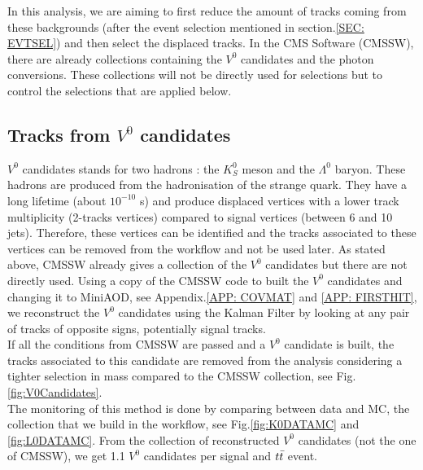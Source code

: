 \documentclass{cernatlasnote}
\begin{document}
    In this analysis, we are aiming to first reduce the amount of tracks coming from these backgrounds (after the event selection mentioned in section.\ref{SEC: EVTSEL}) and then select the displaced tracks. In the CMS Software (CMSSW), there are already collections containing the $V^0$ candidates and the photon conversions. These collections will not be directly used for selections but to control the selections that are applied below.

    
    \subsection{Tracks from $V^0$ candidates}
        $V^0$ candidates stands for two hadrons : the $K^0_S$ meson and the $\Lambda^{0}$ baryon. These hadrons are produced from the hadronisation of the strange quark. They have a long lifetime (about $10^{-10}$ s) and produce  displaced vertices with a lower track multiplicity (2-tracks vertices) compared to signal vertices (between 6 and 10 jets). Therefore, these vertices can be identified and the tracks associated to these vertices can be removed from the workflow and not be used later.
         As stated above, CMSSW already gives a collection of the $V^0$ candidates \cite{V0CAND} but there are not directly used. Using a copy of the CMSSW code to built the $V^0$ candidates and changing it to MiniAOD, see Appendix.\ref{APP: COVMAT} and \ref{APP: FIRSTHIT}, we reconstruct the  $V^0$ candidates using the Kalman Filter \cite{KVF} by looking at any pair of tracks of opposite signs, potentially signal tracks.\\
        If all the conditions from CMSSW are passed and a $V^0$ candidate is built, the tracks associated to this candidate are removed from the analysis considering a tighter selection in mass compared to the CMSSW collection, see Fig.\ref{fig:V0Candidates}.\\

        The monitoring of this method is done by comparing between data and MC, the collection that we build in the workflow, see Fig.\ref{fig:K0DATAMC} and \ref{fig:L0DATAMC}. From the collection of reconstructed $V^0$ candidates (not the one of CMSSW), we get 1.1 $V^0$ candidates per signal and $t\Bar{t}$ event.
\end{document}
